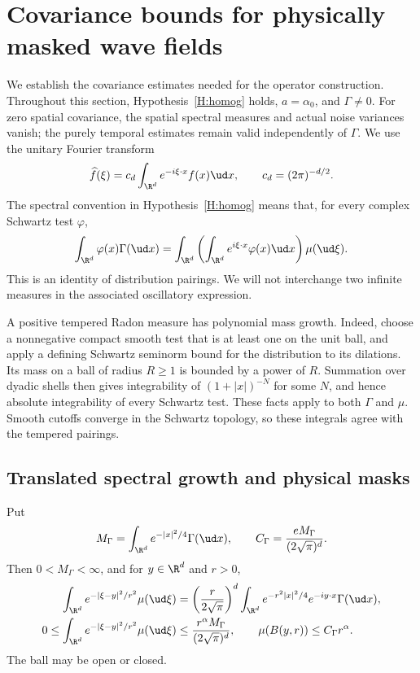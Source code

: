 \section{Covariance bounds for physically masked wave fields}
\label{S:masked-covariance}

We establish the covariance estimates needed for the operator construction.
Throughout this section, Hypothesis~\ref{H:homog} holds, $a = \alpha_0$,
and $\Gamma \ne 0$. For zero spatial covariance, the spatial spectral
measures and actual noise variances vanish; the purely temporal estimates
remain valid independently of $\Gamma$. We use the unitary Fourier transform
\[
  \widehat f(\xi) = c_d\int_{\R^d}e^{-i\xi\cdot x}f(x)\ud x,
  \qquad c_d = (2\pi)^{-d/2}.
\]
The spectral convention in Hypothesis~\ref{H:homog} means that, for every
complex Schwartz test $\varphi$,
\begin{equation}\label{E:masked-spectral-convention}
  \int_{\R^d}\varphi(x)\Gamma(\ud x)
  = \int_{\R^d}\left(\int_{\R^d}e^{i\xi\cdot x}
  \varphi(x)\ud x\right)\mu(\ud\xi).
\end{equation}
This is an identity of distribution pairings. We will not interchange
two infinite measures in the associated oscillatory expression.

A positive tempered Radon measure has polynomial mass growth. Indeed,
choose a nonnegative compact smooth test that is at least one on the unit
ball, and apply a defining Schwartz seminorm bound for the distribution
to its dilations. Its mass on a ball of radius $R \ge 1$ is bounded by a
power of $R$. Summation over dyadic shells then gives integrability of
$(1+|x|)^{-N}$ for some $N$, and hence absolute integrability of every
Schwartz test. These facts apply to both $\Gamma$ and $\mu$. Smooth cutoffs
converge in the Schwartz topology, so these integrals agree with the
tempered pairings.

\subsection{Translated spectral growth and physical masks}

\begin{proposition}\label{P:masked-spectral-growth}
  Put
  \[
    M_\Gamma = \int_{\R^d}e^{-|x|^2/4}\Gamma(\ud x),
    \qquad C_\Gamma = \frac{eM_\Gamma}{(2\sqrt{\pi})^d}.
  \]
  Then $0 < M_\Gamma < \infty$, and for $y \in \R^d$ and $r > 0$,
  \begin{align}
    \int_{\R^d}e^{-|\xi-y|^2/r^2}\mu(\ud\xi)
    &= \left(\frac{r}{2\sqrt{\pi}}\right)^d
    \int_{\R^d}e^{-r^2|x|^2/4}e^{-iy\cdot x}\Gamma(\ud x),
    \label{E:masked-gaussian-transform}\\
    0 \le \int_{\R^d}e^{-|\xi-y|^2/r^2}\mu(\ud\xi)
    &\le \frac{r^\alpha M_\Gamma}{(2\sqrt{\pi})^d},
    \qquad \mu(B(y,r)) \le C_\Gamma r^\alpha.
    \label{E:masked-translated-ball}
  \end{align}
  The ball may be open or closed.
\end{proposition}

